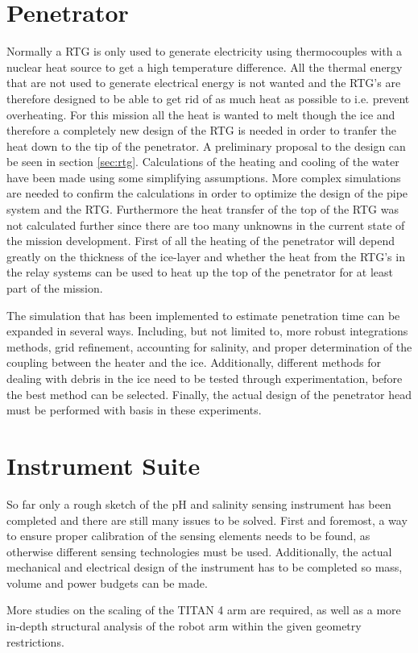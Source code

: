 \section{Penetrator}

Normally a RTG is only used to generate electricity using thermocouples with a nuclear heat source to get a high temperature difference. All the thermal energy that are not used to generate electrical energy is not wanted and the RTG's are therefore designed to be able to get rid of as much heat as possible to i.e. prevent overheating. For this mission all the heat is wanted to melt though the ice and therefore a completely new design of the RTG is needed in order to tranfer the heat down to the tip of the penetrator. A preliminary proposal to the design can be seen in section \ref{sec:rtg}. Calculations of the heating and cooling of the water have been made using some simplifying assumptions. More complex simulations are needed to confirm the calculations in order to optimize the design of the pipe system and the RTG. Furthermore the heat transfer of the top of the RTG was not calculated further since there are too many unknowns in the current state of the mission development. First of all the heating of the penetrator will depend greatly on the thickness of the ice-layer and whether the heat from the RTG's in the relay systems can be used to heat up the top of the penetrator for at least part of the mission.

The simulation that has been implemented to estimate penetration time can be expanded in several ways. Including, but not limited to, more robust integrations methods, grid refinement, accounting for salinity, and proper determination of the coupling between the heater and the ice. Additionally, different methods for dealing with debris in the ice need to be tested through experimentation, before the best method can be selected. Finally, the actual design of the penetrator head must be performed with basis in these experiments.

\section{Instrument Suite}
	
So far only a rough sketch of the pH and salinity sensing instrument has been completed and there are still many issues to be solved. First and foremost, a way to ensure proper calibration of the sensing elements needs to be found, as otherwise different sensing technologies must be used. Additionally, the actual mechanical and electrical design of the instrument has to be completed so mass, volume and power budgets can be made.

More studies on the scaling of the TITAN 4 arm are required, as well as a more in-depth structural analysis of the robot arm within the given geometry restrictions.


